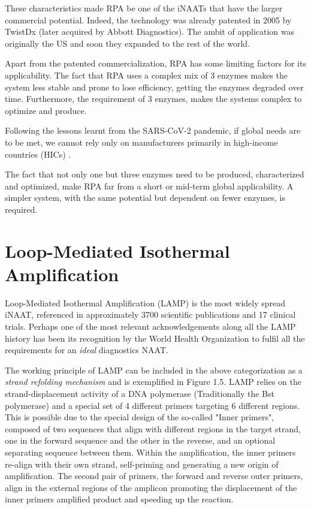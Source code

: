 These characteristics made RPA be one of the iNAATs that have the larger commercial potential. Indeed, the technology was already patented in 2005 by TwistDx (later acquired by Abbott Diagnostics). The ambit of application was originally the US and soon they expanded to the rest of the world\cite{armes_recombinase_2007}.

Apart from the patented commercialization, RPA has some limiting factors for its applicability. The fact that RPA uses a complex mix of 3 enzymes makes the system less stable and prone to lose efficiency, getting the enzymes degraded over time. Furthermore, the requirement of 3 enzymes, makes the systems complex to optimize and produce. 

Following the lessons learnt from the SARS-CoV-2 pandemic, if global needs are to be met, we cannot rely only on manufacturers primarily in high-income countries (HICs) \cite{medecins_sans_frontieres_local_2021}. 

The fact that not only one but three enzymes need to be produced, characterized and optimized, make RPA far from a short or mid-term global applicability. A simpler system, with the same potential but dependent on fewer enzymes, is required.

\section{Loop-Mediated Isothermal Amplification}

Loop-Mediated Isothermal Amplification (LAMP)\cite{notomi_loop-mediated_2000} is the most widely spread iNAAT, referenced in approximately 3700 scientific publications and 17 clinical trials\cite{clinicaltrialsgov_loop-mediated_2022}. Perhaps one of the most relevant acknowledgements along all the LAMP history has been its recognition by the World Health Organization to fulfil all the requirements for an \emph{ideal} diagnostics NAAT\cite{wong_loop-mediated_2018}.


The working principle of LAMP can be included in the above categorization as a \emph{strand refolding mechanism} and is exemplified in Figure 1.5. LAMP relies on the strand-displacement activity of a DNA polymerase (Traditionally the Bst polymerase\cite{notomi_loop-mediated_2000}) and a special set of 4 different primers targeting 6 different regions. This is possible due to the special design of the so-called "Inner primers", composed of two sequences that align with different regions in the target strand, one in the forward sequence and the other in the reverse, and an optional separating sequence between them. Within the amplification, the inner primers re-align with their own strand, self-priming and generating a new origin of amplification. The second pair of primers, the forward and reverse outer primers, align in the external regions of the amplicon promoting the displacement of the inner primers amplified product and speeding up the reaction. 

